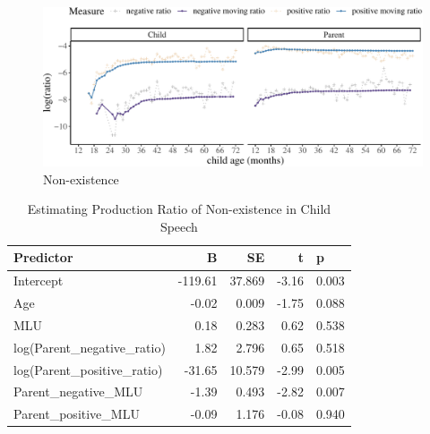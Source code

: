 \documentclass[
  english,
  man,floatsintext]{apa6}
\begin{document}
\begin{figure}[H]

{\centering \includegraphics{results_files/figure-latex/existence-1} 

}

\caption{Non-existence}\label{fig:existence}
\end{figure}

\clearpage

\begin{table}

\caption{\label{tab:unnamed-chunk-3}Estimating Production Ratio of Non-existence in Child Speech}
\centering
\begin{tabular}[t]{l|r|r|r|l}
\hline
Predictor & B & SE & t & p\\
\hline
Intercept & -119.61 & 37.869 & -3.16 & 0.003\\
\hline
Age & -0.02 & 0.009 & -1.75 & 0.088\\
\hline
MLU & 0.18 & 0.283 & 0.62 & 0.538\\
\hline
log(Parent\_negative\_ratio) & 1.82 & 2.796 & 0.65 & 0.518\\
\hline
log(Parent\_positive\_ratio) & -31.65 & 10.579 & -2.99 & 0.005\\
\hline
Parent\_negative\_MLU & -1.39 & 0.493 & -2.82 & 0.007\\
\hline
Parent\_positive\_MLU & -0.09 & 1.176 & -0.08 & 0.940\\
\hline
\end{tabular}
\end{table}
\end{document}
